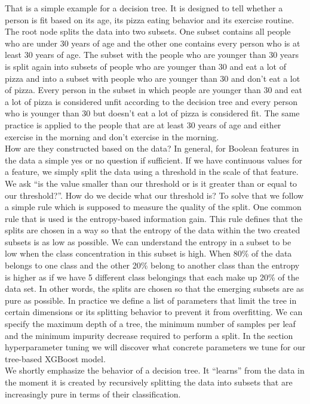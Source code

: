 \documentclass[a4paper,12pt]{report}
\begin{document}
	That is a simple example for a decision tree. It is designed to tell whether a person is fit based on its age, its pizza eating behavior and its exercise routine. The root node splits the data into two subsets. One subset contains all people who are under 30 years of age and the other one contains every person who is at least 30 years of age. The subset with the people who are younger than 30 years is split again into subsets of people who are younger than 30 and eat a lot of pizza and into a subset with people who are younger than 30 and don’t eat a lot of pizza. Every person in the subset in which people are younger than 30 and eat a lot of pizza is considered unfit according to the decision tree and every person who is younger than 30 but doesn’t eat a lot of pizza is considered fit. The same practice is applied to the people that are at least 30 years of age and either exercise in the morning and don’t exercise in the morning.\\	
	How are they constructed based on the data? In general, for Boolean features in the data a simple yes or no question if sufficient. If we have continuous values for a feature, we simply split the data using a threshold in the scale of that feature. We ask “is the value smaller than our threshold or is it greater than or equal to our threshold?”. How do we decide what our threshold is? To solve that we follow a simple rule which is supposed to measure the quality of the split. One common rule that is used is the entropy-based information gain. This rule defines that the splits are chosen in a way so that the entropy of the data within the two created subsets is as low as possible. We can understand the entropy in a subset to be low when the class concentration in this subset is high. When 80\% of the data belongs to one class and the other 20\% belong to another class than the entropy is higher as if we have 5 different class belongings that each make up 20\% of the data set. In other words, the splits are chosen so that the emerging subsets are as pure as possible. In practice we define a list of parameters that limit the tree in certain dimensions or its splitting behavior to prevent it from overfitting. We can specify the maximum depth of a tree, the minimum number of samples per leaf and the minimum impurity decrease required to perform a split. In the section hyperparameter tuning we will discover what concrete parameters we tune for our tree-based XGBoost model.\\
	We shortly emphasize the behavior of a decision tree. It “learns” from the data in the moment it is created by recursively splitting the data into subsets that are increasingly pure in terms of their classification. \\
	
\end{document}
